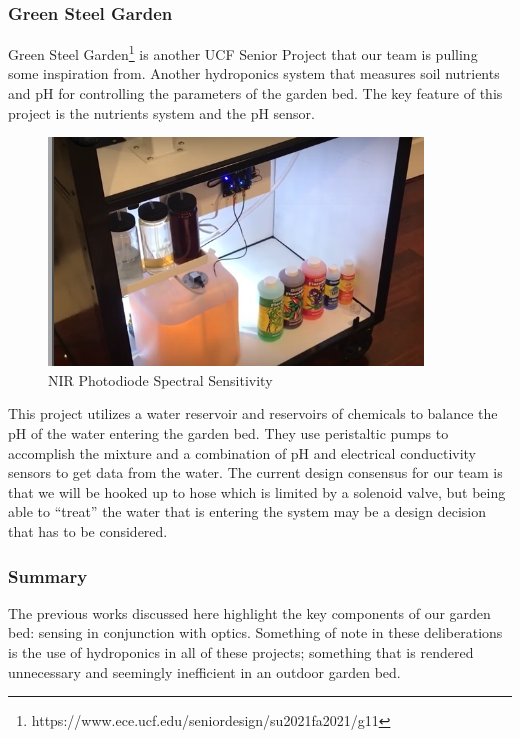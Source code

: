 \subsubsection{Green Steel Garden}
Green Steel Garden\footnote{https://www.ece.ucf.edu/seniordesign/su2021fa2021/g11} is another UCF Senior Project that our team is pulling some inspiration from. Another hydroponics system that measures soil nutrients and pH for controlling the parameters of the garden bed. The key feature of this project is the nutrients system and the pH sensor.

\begin{figure}[H]
    \caption{NIR Photodiode Spectral Sensitivity}
    \centering
    \includegraphics[width=\textwidth]{images/3.1.6Pic.png}
\end{figure}

This project utilizes a water reservoir and reservoirs of chemicals to balance the pH of the water entering the garden bed. They use peristaltic pumps to accomplish the mixture and a combination of pH and electrical conductivity sensors to get data from the water. The current design consensus for our team is that we will be hooked up to hose which is limited by a solenoid valve, but being able to ``treat'' the water that is entering the system may be a design decision that has to be considered.

\subsubsection{Summary}

The previous works discussed here highlight the key components of our garden bed: sensing in conjunction with optics. Something of note in these deliberations is the use of hydroponics in all of these projects; something that is rendered unnecessary and seemingly inefficient in an outdoor garden bed.

